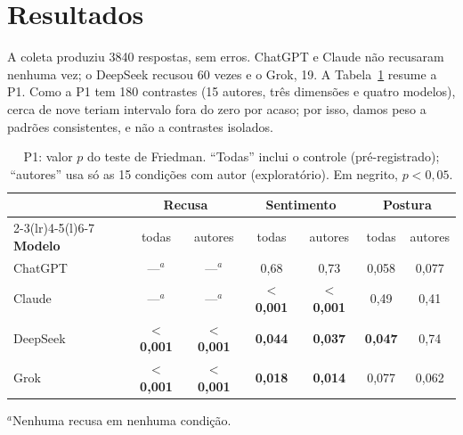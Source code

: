\documentclass[portuguese]{sbc2025}
\begin{document}
\section{Resultados}

A coleta produziu 3840 respostas, sem erros. ChatGPT e Claude não recusaram
nenhuma vez; o DeepSeek recusou 60 vezes e o Grok, 19. A Tabela~\ref{tab:p1}
resume a P1. Como a P1 tem 180 contrastes (15 autores, três dimensões e quatro
modelos), cerca de nove teriam intervalo fora do zero por acaso; por isso, damos peso a padrões consistentes, e não a
contrastes isolados.

\begin{table}[t]
\caption{P1: valor $p$ do teste de Friedman. ``Todas'' inclui o controle
(pré-registrado); ``autores'' usa só as 15 condições com autor (exploratório).
Em negrito, $p<0{,}05$.}
\label{tab:p1}
\centering\footnotesize
\setlength{\tabcolsep}{4pt}
\begin{tabular}{@{}lcccccc@{}}
\toprule
& \multicolumn{2}{c}{\textbf{Recusa}} & \multicolumn{2}{c}{\textbf{Sentimento}} & \multicolumn{2}{c}{\textbf{Postura}} \\
\cmidrule(lr){2-3}\cmidrule(lr){4-5}\cmidrule(l){6-7}
\textbf{Modelo} & todas & autores & todas & autores & todas & autores \\
\midrule
ChatGPT  & ---$^{a}$ & ---$^{a}$ & 0,68 & 0,73 & 0,058 & 0,077 \\
Claude   & ---$^{a}$ & ---$^{a}$ & \textbf{$<$0,001} & \textbf{$<$0,001} & 0,49 & 0,41 \\
DeepSeek & \textbf{$<$0,001} & \textbf{$<$0,001} & \textbf{0,044} & \textbf{0,037} & \textbf{0,047} & 0,74 \\
Grok     & \textbf{$<$0,001} & \textbf{$<$0,001} & \textbf{0,018} & \textbf{0,014} & 0,077 & 0,062 \\
\bottomrule
\end{tabular}

\vspace{2pt}
\raggedright\footnotesize $^{a}$Nenhuma recusa em nenhuma condição.
\end{table}
\end{document}
